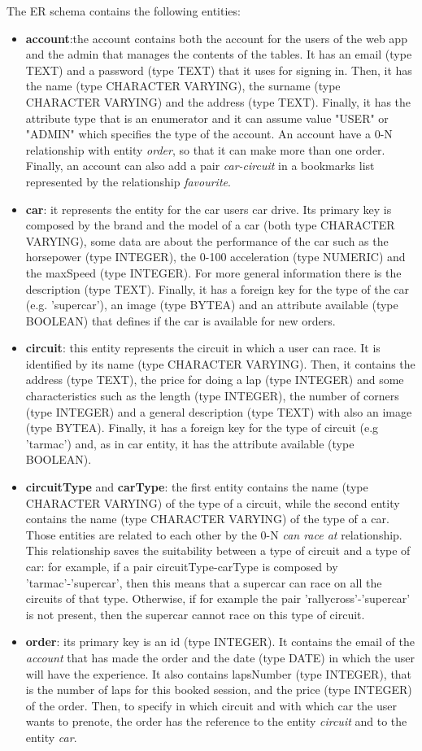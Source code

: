 The ER schema contains the following entities:
\begin{itemize}
	\item \textbf{account}:the account contains both the account for the users of the web app and the admin that manages the contents of the tables. It has an email (type TEXT) and a password (type TEXT) that it uses for signing in. Then, it has the name (type CHARACTER VARYING), the surname (type CHARACTER VARYING) and the address (type TEXT). Finally, it has the attribute type that is an enumerator and it can assume value "USER" or "ADMIN" which specifies the type of the account. An account have a 0-N relationship with entity \textit{order}, so that it can make more than one order. Finally, an account can also add a pair \textit{car-circuit} in a bookmarks list represented by the relationship \textit{favourite}.
	\item \textbf{car}: it represents the entity for the car users car drive. Its primary key is composed by the brand and the model of a car (both type CHARACTER VARYING), some data are about the performance of the car such as the horsepower (type INTEGER), the 0-100 acceleration (type NUMERIC) and the maxSpeed (type INTEGER). For more general information there is the description (type TEXT). Finally, it has a foreign key for the type of the car (e.g. 'supercar'), an image (type BYTEA) and an attribute available (type BOOLEAN) that defines if the car is available for new orders.
	\item \textbf{circuit}: this entity represents the circuit in which a user can race. It is identified by its name (type CHARACTER VARYING). Then, it contains the address (type TEXT), the price for doing a lap (type INTEGER) and some characteristics such as the length (type  INTEGER), the number of corners (type INTEGER) and a general description (type TEXT) with also an image (type BYTEA). Finally, it has a foreign key for the type of circuit (e.g 'tarmac') and, as in car entity, it has the attribute available (type BOOLEAN). 
	\item \textbf{circuitType} and \textbf{carType}: the first entity contains the name (type CHARACTER VARYING) of the type of a circuit, while the second entity contains the name (type CHARACTER VARYING) of the type of a car. Those entities are related to each other by the 0-N \textit{can race at} relationship. This relationship saves the suitability between a type of circuit and a type of car: for example, if a pair circuitType-carType is composed by 'tarmac'-'supercar', then this means that a supercar can race on all the circuits of that type. Otherwise, if for example the pair 'rallycross'-'supercar' is not present, then the supercar cannot race on this type of circuit.
	\item \textbf{order}: its primary key is an id (type INTEGER). It contains the email of the \textit{account} that has made the order and the date (type DATE) in which the user will have the experience. It also contains lapsNumber (type INTEGER), that is the number of laps for this booked session, and the price (type INTEGER) of the order. Then, to specify in which circuit and with which car the user wants to prenote, the order has the reference to the entity \textit{circuit} and to the entity \textit{car}.
\end{itemize}
